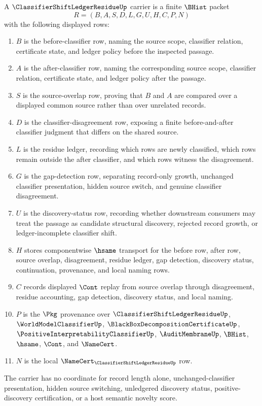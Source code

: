 \begin{definition}
\label{def:classifier-shift-ledger-residue-carrier}
A $\ClassifierShiftLedgerResidueUp$ carrier is a finite $\BHist$ packet
$$
R=(B,A,S,D,L,G,U,H,C,P,N)
$$
with the following displayed rows:
\begin{enumerate}
\item $B$ is the before-classifier row, naming the source scope, classifier relation, certificate state, and ledger policy before the inspected passage.
\item $A$ is the after-classifier row, naming the corresponding source scope, classifier relation, certificate state, and ledger policy after the passage.
\item $S$ is the source-overlap row, proving that $B$ and $A$ are compared over a displayed common source rather than over unrelated records.
\item $D$ is the classifier-disagreement row, exposing a finite before-and-after classifier judgment that differs on the shared source.
\item $L$ is the residue ledger, recording which rows are newly classified, which rows remain outside the after classifier, and which rows witness the disagreement.
\item $G$ is the gap-detection row, separating record-only growth, unchanged classifier presentation, hidden source switch, and genuine classifier disagreement.
\item $U$ is the discovery-status row, recording whether downstream consumers may treat the passage as candidate structural discovery, rejected record growth, or ledger-incomplete classifier shift.
\item $H$ stores componentwise $\hsame$ transport for the before row, after row, source overlap, disagreement, residue ledger, gap detection, discovery status, continuation, provenance, and local naming rows.
\item $C$ records displayed $\Cont$ replay from source overlap through disagreement, residue accounting, gap detection, discovery status, and local naming.
\item $P$ is the $\Pkg$ provenance over $\ClassifierShiftLedgerResidueUp$, $\WorldModelClassifierUp$, $\BlackBoxDecompositionCertificateUp$, $\PositiveInterpretabilityClassifierUp$, $\AuditMembraneUp$, $\BHist$, $\hsame$, $\Cont$, and $\NameCert$.
\item $N$ is the local $\NameCert_{\ClassifierShiftLedgerResidueUp}$ row.
\end{enumerate}
The carrier has no coordinate for record length alone, unchanged-classifier presentation, hidden source switching, unledgered discovery status, positive-discovery certification, or a host semantic novelty score.
\end{definition}


